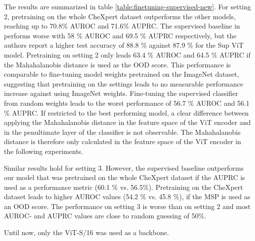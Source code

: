 \par
The results are summarized in table \ref{table:finetuning-supervised-new}.
For setting 2, pretraining on the whole CheXpert dataset outperforms the other models, reaching up to 70.8\% AUROC and 71.6\% AUPRC.
The supervised baseline in \citep{Berger2021} performs worse with 58 \% AUROC and 69.5 \% AUPRC respectively, but the authors report a higher test accuracy of 88.8 \% against 87.9 \% for the Sup ViT model.
Pretraining on setting 2 only leads 63.4 \% AUROC and 64.5 \% AUPRC if the Mahahalanobis distance is used as the OOD score.
This performance is comparable to fine-tuning model weights pretrained on the ImageNet dataset, suggesting that pretraining on the settings leads to no measurable performance increase against using ImageNet weights.
Fine-tuning the supervised classifier from random weights leads to the worst performance of 56.7 \% AUROC and 56.1 \% AUPRC.
If restricted to the best performing model, a clear difference between applying the Mahahalanobis distance in the feature space of the ViT encoder and in the penultimate layer of the classifier is not observable.
The Mahahalanobis distance is therefore only calculated in the feature space of the ViT encoder in the following experiments.
\par
Similar results hold for setting 3. However, the supervised baseline outperforms our model that was pretrained on the whole CheXpert dataset if the AUPRC is used as a performance metric (60.1 \% vs. 56.5\%).
Pretraining on the CheXpert dataset leads to higher AUROC values (54.2 \% vs. 45.8 \%), if the MSP is used as an OOD score. 
The performance on setting 3 is worse than on setting 2 and most AUROC- and AUPRC values are close to random guessing of 50\%.
\par
Until now, only the ViT-S/16 was used as a backbone.

